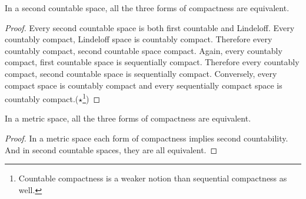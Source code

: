 \begin{theorem}
	In a second countable space, all the three forms of compactness are equivalent.
	\cite[11.1.10]{joshi}
\end{theorem}
\begin{proof}
	Every second countable space is both first countable and Lindeloff.
	Every countably compact, Lindeloff space is countably compact.
	Therefore every countably compact, second countable space compact.
	Again, every countably compact, first countable space is sequentially compact.
	Therefore every countably compact, second countable space is sequentially compact.
	Conversely, every compact space is countably compact and every sequentially compact space is countably compact.($\star$\footnote{Countable compactness is a weaker notion than sequential compactness as well.})
\end{proof}

\begin{theorem}
	In a metric space, all the three forms of compactness are equivalent.
	\cite[11.1.11]{joshi}
\end{theorem}
\begin{proof}
	In a metric space each form of compactness implies second countability.
	And in second countable spaces, they are all equivalent.
\end{proof}



